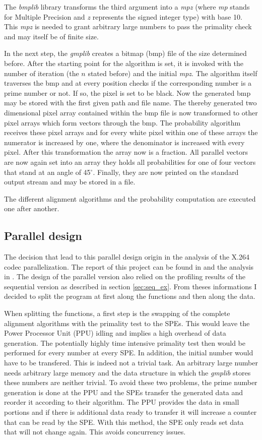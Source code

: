 The \emph{bmplib} library transforms the third argument into a \emph{mpz} (where \emph{mp} stands for Multiple Precision and \emph{z} represents the signed integer type) with base 10. This \emph{mpz} is needed to grant arbitrary large numbers to pass the primality check and may itself be of finite size.

In the next step, the \emph{gmplib} creates a bitmap (bmp) file of the size determined before. After the starting point for the algorithm is set, it is invoked with the number of iteration (the $n$ stated before) and the initial \emph{mpz}. The algorithm itself traverses the bmp and at every position checks if the corresponding number is a prime number or not. If so, the pixel is set to be black.
Now the generated bmp may be stored with the first given path and file name.
The thereby generated two dimensional pixel array contained within the bmp file is now transformed to other pixel arrays which form vectors through the bmp. The probability algorithm receives these pixel arrays and for every white pixel within one of these arrays the numerator is increased by one, where the denominator is increased with every pixel. After this transformation the array now is a fraction. All parallel vectors are now again set into an array they holds all probabilities for one of four vectors that stand at an angle of 45$^\circ$. Finally, they are now printed on the standard output stream and may be stored in a file.

The different alignment algorithms and the probability computation are executed one after another.

\subsection{Parallel design}
\label{sec:paralleldesign}
The decision that lead to this parallel design origin in the analysis of the X.264 codec parallelization. The report of this project can be found in \cite{BS08} and the analysis in \cite{self}. The design of the parallel version also relied on the profiling results of the sequential version as described in section \ref{sec:seq_ex}. From theses informations I decided to split the program at first along the functions and then along the data.

When splitting the functions, a first step is the swapping of the complete alignment algorithms with the primality test to the SPEs. This would leave the Power Processor Unit (PPU) idling and implies a high overhead of data generation. The potentially highly time intensive primality test then would be performed for every number at every SPE. In addition, the initial number would have to be transfered. This is indeed not a trivial task. An arbitrary large number needs arbitrary large memory and the data structure in which the \emph{gmplib} stores these numbers are neither trivial.
To avoid these two problems, the prime number generation is done at the PPU and the SPEs transfer the generated data and reorder it according to their algorithm.
The PPU provides the data in small portions and if there is additional data ready to transfer it will increase a counter that can be read by the SPE. With this method, the SPE only reads set data that will not change again. This avoids concurrency issues.

